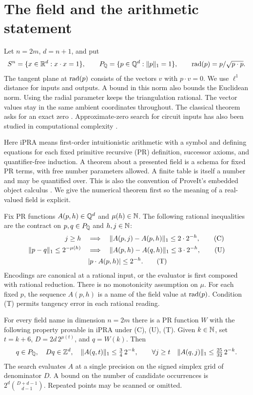 \section{The field and the arithmetic statement}\label{sec:presentation}
Let $n=2m$, $d=n+1$, and put
\[
 S^n=\{x\in\mathbb R^d:x\cdot x=1\},\qquad
 P_{\mathbb Q}=\{p\in\mathbb Q^d:\lVert p\rVert_1=1\},\qquad
 \operatorname{rad}(p)=p/\sqrt{p\cdot p}.
\]
The tangent plane at $\operatorname{rad}(p)$ consists of the vectors $v$ with
$p\cdot v=0$. We use $\ell^1$ distance for inputs and outputs. A bound
in this norm also bounds the Euclidean norm. Using the radial parameter
keeps the triangulation rational. The vector values stay in the same
ambient coordinates throughout. The classical theorem asks for an
exact zero \cite{wiki}. Approximate-zero search for circuit inputs has
also been studied in computational complexity \cite{gh}.

Here iPRA means first-order intuitionistic arithmetic with a symbol and
defining equations for each fixed primitive recursive (PR) definition,
successor axioms, and quantifier-free induction. A theorem about a
presented field is a schema for fixed PR terms, with free number
parameters allowed. A finite table is itself a number and may be
quantified over. This is also the convention of ProveIt's embedded
object calculus \cite{deriv}. We give the numerical theorem first so the
meaning of a real-valued field is explicit.

\begin{definition}\label{def:name}
Fix PR functions $A(p,h)\in\mathbb Q^d$ and $\mu(h)\in\mathbb N$. The following
rational inequalities are the contract on $p,q\in P_\mathbb Q$ and
$h,j\in\mathbb N$:
\begin{align}
 j\ge h\quad &\Longrightarrow\quad
       \lVert A(p,j)-A(p,h)\rVert_1\le 2\cdot 2^{-h},                  \tag{C}\\
 \lVert p-q\rVert_1\le2^{-\mu(h)}\quad &\Longrightarrow\quad
       \lVert A(p,h)-A(q,h)\rVert_1\le3\cdot 2^{-h},                   \tag{U}\\
 & |p\cdot A(p,h)|\le2^{-h}.                                 \tag{T}
\end{align}
Encodings are canonical at a rational input, or the evaluator is first
composed with rational reduction. There is no monotonicity assumption
on $\mu$. For each fixed $p$, the sequence $A(p,h)$ is a name of the
field value at $\operatorname{rad}(p)$. Condition (T) permits tangency error in each
rational reading.
\end{definition}

\begin{theorem}\label{thm:main}
For every field name in dimension $n=2m$ there is a PR function $W$
with the following property provable in iPRA under (C), (U), (T).
Given $k\in\mathbb N$, set $t=k+6$, $D=2d\,2^{\mu(t)}$, and $q=W(k)$.
Then
\[
  q\in P_\mathbb Q,\quad Dq\in\mathbb Z^d,\quad
  \lVert A(q,t)\rVert_1\le\tfrac34\,2^{-k},\qquad
  \forall j\ge t\quad \lVert A(q,j)\rVert_1\le\tfrac{25}{32}\,2^{-k}.
\]
The search evaluates $A$ at a single precision on the signed simplex
grid of denominator $D$. A bound on the number of candidate occurrences is
$2^d\binom{D+d-1}{d-1}$. Repeated points may be scanned or omitted.
\end{theorem}

